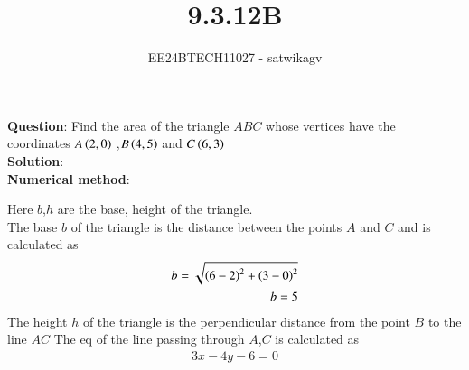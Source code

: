 \documentclass[journal]{IEEEtran}
\begin{document}

\vspace{3cm}

\title{9.3.12B}
\author{EE24BTECH11027 - satwikagv}
{\let\newpage\relax\maketitle}

\renewcommand{\thefigure}{\theenumi}
\renewcommand{\thetable}{\theenumi}
\setlength{\intextsep}{10pt} %


\renewcommand{\thetable}{\theenumi}
\textbf{Question}:
Find the area of the triangle $ABC$  whose vertices have the coordinates $A\left(2,0\right)$ ,$B\left(4,5\right)$ and $C\left(6,3\right)$\\
\textbf{Solution}:\\
\textbf{Numerical method}:\\
\begin{center}
\end{center}
Here $b$,$h$ are the base, height of the triangle.\\
The base $b$ of the triangle is the distance between the points $A$ and $C$ and is calculated as 
\begin{align}
    b=\sqrt{\left(6-2\right)^2+\left(3-0\right)^2}\\
    b=5
\end{align}
The height $h$ of the triangle is the perpendicular distance from the point $B$ to the line $AC$
The eq of the line passing through $A$,$C$ is calculated as 
\begin{align}
    3x-4y-6=0
\end{align}
\end{document}
